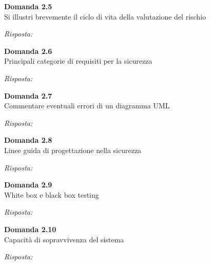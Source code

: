 \documentclass{article}
\newenvironment{problem}[2][Domanda]
    { \begin{mdframed}[backgroundcolor=gray!20] \textbf{#1 #2} \\}
    {  \end{mdframed}}
\newenvironment{solution}
    {\textit{Risposta:}}
    {}
\begin{document}
\begin{problem}{2.5}
Si illustri brevemente il ciclo di vita della valutazione del rischio
\end{problem}
\begin{solution}
\end{solution}

\begin{problem}{2.6}
Principali categorie di requisiti per la sicurezza
\end{problem}
\begin{solution}
\end{solution}


\begin{problem}{2.7}
Commentare eventuali errori di un diagramma UML
\end{problem}
\begin{solution}
\end{solution}


\begin{problem}{2.8}
Linee guida di progettazione nella sicurezza
\end{problem}
\begin{solution}
\end{solution}

\begin{problem}{2.9}
White box e black box testing
\end{problem}
\begin{solution}
\end{solution}

\begin{problem}{2.10}
Capacità di sopravvivenza del sistema
\end{problem}
\begin{solution}
\end{solution}
\end{document}
